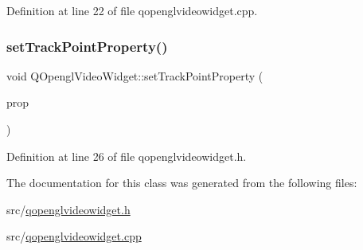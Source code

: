 Definition at line 22 of file qopenglvideowidget.\+cpp.

\mbox{\label{class_q_opengl_video_widget_a66fe89ddc0d8ba4600320dd00bb5ddee}} 
\subsubsection{\texorpdfstring{setTrackPointProperty()}{setTrackPointProperty()}}
{\footnotesize\ttfamily void Q\+Opengl\+Video\+Widget\+::set\+Track\+Point\+Property (\begin{DoxyParamCaption}\item[{\mbox{\hyperlink{struct_track_point_property}{Track\+Point\+Property}} $\ast$}]{prop }\end{DoxyParamCaption})\hspace{0.3cm}{\ttfamily [inline]}}



Definition at line 26 of file qopenglvideowidget.\+h.



The documentation for this class was generated from the following files\+:\begin{DoxyCompactItemize}
\item 
src/\mbox{\hyperlink{qopenglvideowidget_8h}{qopenglvideowidget.\+h}}\item 
src/\mbox{\hyperlink{qopenglvideowidget_8cpp}{qopenglvideowidget.\+cpp}}\end{DoxyCompactItemize}
